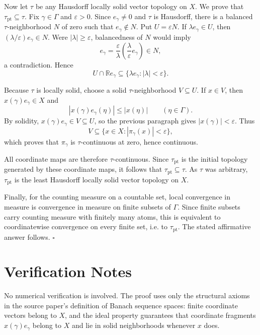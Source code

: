 \documentclass[11pt]{article}
\newcommand{\GammaSet}{\Gamma}
\newcommand{\pt}{\mathrm{pt}}
\newcommand{\abs}[1]{\left\lvert #1 \right\rvert}
\begin{document}
Now let \(\tau\) be any Hausdorff locally solid vector topology on \(X\).  We
prove that \(\tau_{\pt}\subseteq\tau\).  Fix \(\gamma\in\GammaSet\) and
\(\varepsilon>0\).  Since \(e_\gamma\ne 0\) and \(\tau\) is Hausdorff, there is
a balanced \(\tau\)-neighborhood \(N\) of zero such that
\(e_\gamma\notin N\).  Put \(U=\varepsilon N\).  If
\(\lambda e_\gamma\in U\), then \((\lambda/\varepsilon)e_\gamma\in N\).  Were
\(\abs{\lambda}\ge\varepsilon\), balancedness of \(N\) would imply
\[
  e_\gamma
  =
  \frac{\varepsilon}{\lambda}
  \left(\frac{\lambda}{\varepsilon}e_\gamma\right)
  \in N,
\]
a contradiction.  Hence
\[
  U\cap \mathbb R e_\gamma
  \subseteq
  \{\lambda e_\gamma:\abs{\lambda}<\varepsilon\}.
\]

Because \(\tau\) is locally solid, choose a solid \(\tau\)-neighborhood
\(V\subseteq U\).  If \(x\in V\), then \(x(\gamma)e_\gamma\in X\) and
\[
  \abs{x(\gamma)e_\gamma(\eta)}
  \le \abs{x(\eta)}
  \qquad(\eta\in\GammaSet).
\]
By solidity, \(x(\gamma)e_\gamma\in V\subseteq U\), so the previous paragraph
gives \(\abs{x(\gamma)}<\varepsilon\).  Thus
\[
  V\subseteq \{x\in X:\abs{\pi_\gamma(x)}<\varepsilon\},
\]
which proves that \(\pi_\gamma\) is \(\tau\)-continuous at zero, hence
continuous.

All coordinate maps are therefore \(\tau\)-continuous.  Since
\(\tau_{\pt}\) is the initial topology generated by these coordinate maps, it
follows that \(\tau_{\pt}\subseteq\tau\).  As \(\tau\) was arbitrary,
\(\tau_{\pt}\) is the least Hausdorff locally solid vector topology on \(X\).

Finally, for the counting measure on a countable set, local convergence in
measure is convergence in measure on finite subsets of \(\GammaSet\).  Since
finite subsets carry counting measure with finitely many atoms, this is
equivalent to coordinatewise convergence on every finite set, i.e. to
\(\tau_{\pt}\).  The stated affirmative answer follows.
\(\square\)

\section*{Verification Notes}

No numerical verification is involved.  The proof uses only the structural
axioms in the source paper's definition of Banach sequence spaces: finite
coordinate vectors belong to \(X\), and the ideal property guarantees that
coordinate fragments \(x(\gamma)e_\gamma\) belong to \(X\) and lie in solid
neighborhoods whenever \(x\) does.
\end{document}
